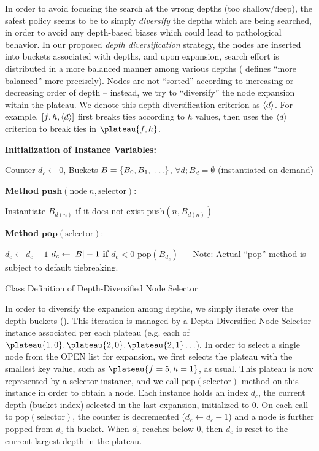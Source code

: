 In order to avoid focusing the search at the wrong depths (too shallow/deep), 
the safest policy seems to be to simply \emph{diversify} the depths which are being searched,
in order to avoid any depth-based biases which could lead to pathological behavior.
In our proposed \emph{depth diversification} strategy, the nodes are inserted into buckets
associated with depths, and upon expansion, search effort is distributed in a more balanced manner
among various depths ( defines ``more balanced''  more precisely).
Nodes are not  ``sorted''
according to increasing or decreasing order of depth -- instead, we try to 
``diversify'' the node expansion within the plateau.
We denote this depth diversification criterion as ${\left<d\right>}$. 
For example, $[f,h,{\left<d\right>}]$ first breaks ties according to $h$ values,
then uses the ${\left<d\right>}$ criterion to break ties in $\plateau{f,h}$.

\begin{algorithm}
 \textbf{Initialization of Instance Variables:}
\begin{algorithmic}
 \STATE Counter $d_c\leftarrow 0$, Buckets $B={\left\{B_0, B_1,\ \ldots\right\}}$, $\forall d; B_d=\emptyset$ (instantiated on-demand)
\end{algorithmic}
 \textbf{Method} $\textbf{push}(\text{node}\ n,\text{selector})$:
\begin{algorithmic}
 \STATE Instantiate $B_{d(n)}$ if it does not exist
 \STATE $\text{push}(n, B_{d(n)})$
\end{algorithmic}
 \textbf{Method} $\textbf{pop}(\text{selector})$:
\begin{algorithmic}
 \LOOP
 \STATE $d_c\leftarrow d_c-1$
 \STATE $d_c\leftarrow {\left|B\right|}-1$ \textbf{if} $d_c<0$
 \RETURN $\text{pop}(B_{d_c})$ --- Note: Actual ``pop'' method is subject to default tiebreaking.
 \ENDIF
 \ENDLOOP
\end{algorithmic}
\caption{Class Definition of Depth-Diversified Node Selector}
\label{alg:depth}
\end{algorithm}

In order to diversify the expansion among depths, we simply
iterate over the depth buckets ().
This iteration is managed by a Depth-Diversified Node Selector instance associated per each plateau (e.g. each of $\plateau{1,0}, \plateau{2,0}, \plateau{2,1}\ldots$).
In order to select a single node from the OPEN list for expansion,
we first selects the plateau with the smallest key value, such as $\plateau{f=5,h=1}$, as usual.
This plateau is now represented by a selector instance, and
we call $\text{pop}(\text{selector})$ method on this instance in order to obtain a node.
Each instance holds
an index $d_c$,
the current depth (bucket index) selected in the last expansion,
initialized to 0.
On each call to $\text{pop}(\text{selector})$,
the counter is decremented ($d_c\leftarrow d_c-1$) and
a node is further popped from $d_c$-th bucket. When $d_c$ reaches below 0, then $d_c$
is reset to the current largest depth in the plateau.


